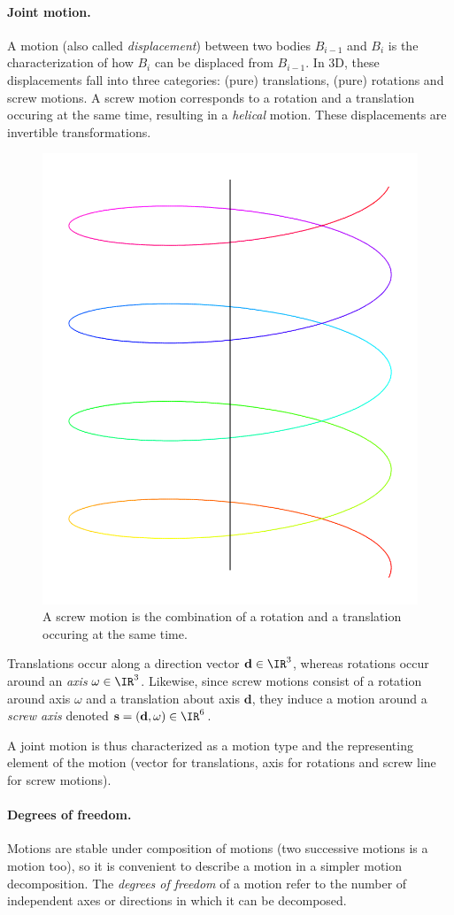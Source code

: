 \paragraph*{Joint motion.} A motion (also called \emph{displacement}) between two bodies $B_{i-1}$ and $B_i$ is the characterization of how $B_i$ can be displaced from $B_{i-1}$. In 3D, these displacements fall into three categories: (pure) translations, (pure) rotations and screw motions. A screw motion corresponds to a rotation and a translation occuring at the same time, resulting in a \emph{helical} motion. These displacements are invertible transformations.
\begin{figure}[!htb]
    \captionsetup{justification=centering}
        \centering
        \includegraphics[trim={0 0 0 0},clip,width=0.3\linewidth]{img/chapter_4/screw_motion.png}
    \caption{A screw motion is the combination of a rotation and a translation occuring at the same time.}
    \label{fig:helical_motion}
\end{figure}

Translations occur along a direction vector $\mathbf{d}\in\IR^3$, whereas rotations occur around an \emph{axis} $\omega\in\IR^3$. Likewise, since screw motions consist of a rotation around axis $\omega$ and a translation about axis $\mathbf{d}$, they induce a motion around a \emph{screw axis} denoted $\mathbf{s} = (\mathbf{d}, \omega) \in \IR^6$.

A joint motion is thus characterized as a motion type and the representing element of the motion (vector for translations, axis for rotations and screw line for screw motions). 


\paragraph*{Degrees of freedom.} Motions are stable under composition of motions (two successive motions is a motion too), so it is convenient to describe a motion in a simpler motion decomposition. The \emph{degrees of freedom} of a motion refer to the number of independent axes or directions in which it can be decomposed. 

